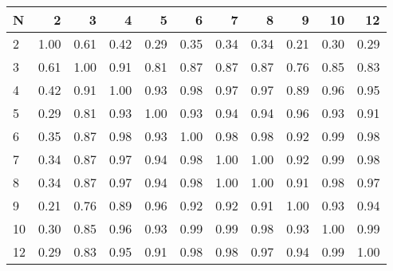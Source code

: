 \begin{tabular}{lrrrrrrrrrr}
\toprule
N &    2  &    3  &    4  &    5  &    6  &    7  &    8  &    9  &    10 &    12 \\
\midrule
2  &  1.00 &  0.61 &  0.42 &  0.29 &  0.35 &  0.34 &  0.34 &  0.21 &  0.30 &  0.29 \\
3  &  0.61 &  1.00 &  0.91 &  0.81 &  0.87 &  0.87 &  0.87 &  0.76 &  0.85 &  0.83 \\
4  &  0.42 &  0.91 &  1.00 &  0.93 &  0.98 &  0.97 &  0.97 &  0.89 &  0.96 &  0.95 \\
5  &  0.29 &  0.81 &  0.93 &  1.00 &  0.93 &  0.94 &  0.94 &  0.96 &  0.93 &  0.91 \\
6  &  0.35 &  0.87 &  0.98 &  0.93 &  1.00 &  0.98 &  0.98 &  0.92 &  0.99 &  0.98 \\
7  &  0.34 &  0.87 &  0.97 &  0.94 &  0.98 &  1.00 &  1.00 &  0.92 &  0.99 &  0.98 \\
8  &  0.34 &  0.87 &  0.97 &  0.94 &  0.98 &  1.00 &  1.00 &  0.91 &  0.98 &  0.97 \\
9  &  0.21 &  0.76 &  0.89 &  0.96 &  0.92 &  0.92 &  0.91 &  1.00 &  0.93 &  0.94 \\
10 &  0.30 &  0.85 &  0.96 &  0.93 &  0.99 &  0.99 &  0.98 &  0.93 &  1.00 &  0.99 \\
12 &  0.29 &  0.83 &  0.95 &  0.91 &  0.98 &  0.98 &  0.97 &  0.94 &  0.99 &  1.00 \\
\bottomrule
\end{tabular}

